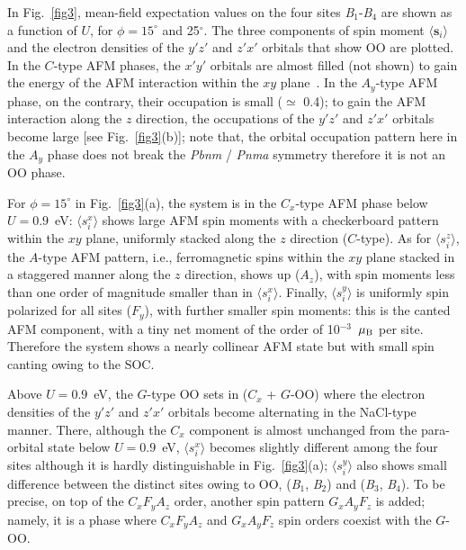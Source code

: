 \documentclass[aps,twocolumn,prb,preprintnumbers,amsmath,amssymb]{revtex4-2}
\begin{document}
In Fig.~\ref{fig3}, 
 mean-field expectation values on the four sites {\it B}$_1$-{\it B}$_4$ are shown 
 as a function of $U$, for $\phi=15^\circ$ and 25$^\circ$.  
The three components of spin moment $\langle {\bm s}_i \rangle$ and the electron densities of the $y'z'$ and $z'x'$ orbitals that show OO are plotted. 
In the $C$-type AFM phases, the $x'y'$ orbitals are almost filled (not shown) to gain the energy of the AFM interaction within the $xy$ plane~\cite{mizokawa}. 
In the $A_y$-type AFM phase, on the contrary, their occupation is small ($\simeq$ 0.4); 
 to gain the AFM interaction along the $z$ direction, 
 the occupations of the $y'z'$ and $z'x'$ orbitals become large [see Fig.~\ref{fig3}(b)]; 
 note that, the orbital occupation pattern here in the $A_y$ phase does not break the {\it Pbnm} / {\it Pnma} symmetry 
 therefore it is not an OO phase. 

For $\phi=15^\circ$ in Fig.~\ref{fig3}(a), the system is in the $C_x$-type AFM phase below $U=0.9$~eV: 
 $\langle s_i^x \rangle$ shows large AFM spin moments with a checkerboard pattern within the $xy$ plane, 
 uniformly stacked along the $z$ direction ($C$-type). 
As for $\langle s_i^z \rangle$, the $A$-type AFM pattern, i.e., ferromagnetic spins within the $xy$ plane 
 stacked in a staggered manner along the $z$ direction, shows up ($A_z$),   
 with spin moments less than one order of magnitude smaller than in $\langle s_i^x \rangle$. 
Finally, $\langle s_i^y \rangle$ is uniformly spin polarized for all sites ($F_y$), 
 with further smaller spin moments: this is the canted AFM component, 
 with a tiny net moment of the order of 10$^{-3}$~$\mu_{\rm B}$ per site. 
Therefore the system shows a nearly collinear AFM state 
 but with small spin canting owing to the SOC. 
 
Above $U=0.9$~eV, the $G$-type OO sets in ($C_x$ + $G$-OO) 
where the electron densities of the $y'z'$ and $z'x'$ orbitals become alternating in the NaCl-type manner. 
There, although the $C_x$ component is almost unchanged from the para-orbital state below $U=0.9$~eV, 
 $\langle s_i^x \rangle$ becomes slightly different among the four sites although it is hardly distinguishable in Fig.~\ref{fig3}(a); 
 $\langle s_i^y \rangle$ also shows small difference between the distinct sites owing to OO, ({\it B}$_1$, {\it B}$_2$) and ({\it B}$_3$, {\it B}$_4$). 
To be precise, on top of the $C_x F_y A_z$ order, another spin pattern $G_x A_y F_z$ is added; 
 namely, it is a phase where  $C_x F_y A_z$ and $G_x A_y F_z$ spin orders coexist with the $G$-OO. 
\end{document}

